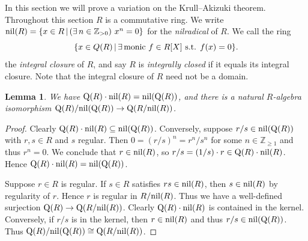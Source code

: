 \documentclass{amsart}
\theoremstyle{plain}
\newtheorem{lemma}[theorem]{Lemma}
\theoremstyle{definition}
\newcommand{\Z}{\ensuremath{\mathbb{Z}}}
\begin{document}
In this section we will prove a variation on the Krull--Akizuki theorem.
Throughout this section \(R\) is a commutative ring.
We write \(\textup{nil}(R)=\{x\in R\,|\, (\exists\, n\in\Z_{>0})\ x^n=0\}\) for the \emph{nilradical} of \(R\).
We call the ring 
\[ \{ x\in Q(R) \,|\, \exists\, \textup{monic } f \in R[X] \textup{ s.t. } f(x)=0 \}. \]
the \emph{integral closure} of $R$, and say $R$ is \emph{integrally closed} if it equals its integral closure.
Note that the integral closure of $R$ need not be a domain.

\begin{lemma}\label{lem:nilQ}
We have \(\textup{Q}(R)\cdot \textup{nil}(R)=\textup{nil}(\textup{Q}(R))\), 
and there is a natural \(R\)-algebra isomorphism \(\textup{Q}(R)/\textup{nil}(\textup{Q}(R))\to \textup{Q}(R/\textup{nil}(R))\).
\end{lemma}
\begin{proof}
Clearly \(\textup{Q}(R) \cdot \textup{nil}(R)\subseteq \textup{nil}(\textup{Q}(R))\). Conversely, suppose \(r/s\in\textup{nil}(\textup{Q}(R))\) with \(r,s\in R\) and \(s\) regular. Then \(0=(r/s)^n=r^n/s^n\) for some \(n\in\Z_{\geq 1}\) and thus \(r^n=0\). We conclude that \(r\in \textup{nil}(R)\), so \(r/s=(1/s) \cdot r \in \textup{Q}(R) \cdot \textup{nil}(R)\). Hence \(\textup{Q}(R) \cdot \textup{nil}(R)= \textup{nil}(\textup{Q}(R))\).

Suppose \(r\in R\) is regular. If \(s\in R\) satisfies \(rs\in\textup{nil}(R)\), then \(s\in\textup{nil}(R)\) by regularity of \(r\). Hence \(r\) is regular in \(R/\textup{nil}(R)\). Thus we have a well-defined surjection \(\textup{Q}(R)\to\textup{Q}(R/\textup{nil}(R))\). Clearly \(\textup{Q}(R)\cdot \textup{nil}(R)\) is contained in the kernel. Conversely, if \(r/s\) is in the kernel, then \(r\in\textup{nil}(R)\) and thus \(r/s\in \textup{nil}(\textup{Q}(R))\). Thus \(\textup{Q}(R)/\textup{nil}(\textup{Q}(R))\cong\textup{Q}(R/\textup{nil}(R))\).
\end{proof}
\end{document}

